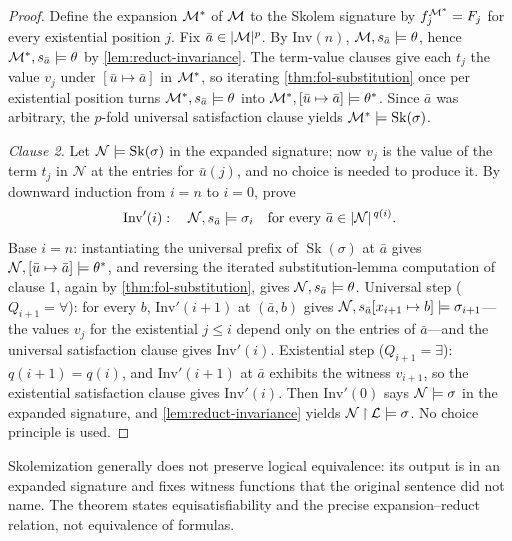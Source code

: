\begin{proof}
Define the expansion \(\mathcal M^{*}\) of \(\mathcal M\) to the Skolem signature
by \(f_j^{\mathcal M^{*}}=F_j\) for every existential position \(j\).  Fix
\(\bar a\in\lvert\mathcal M\rvert^{p}\).  By \(\mathrm{Inv}(n)\),
\(\mathcal M,s_{\bar a}\models\theta\), hence
\(\mathcal M^{*},s_{\bar a}\models\theta\) by \cref{lem:reduct-invariance}.
The term-value clauses give each \(t_j\) the value \(v_j\) under
\([\bar u\mapsto\bar a]\) in \(\mathcal M^{*}\), so iterating
\cref{thm:fol-substitution} once per existential position turns
\(\mathcal M^{*},s_{\bar a}\models\theta\) into
\(\mathcal M^{*},[\bar u\mapsto\bar a]\models\theta^{*}\).  Since \(\bar a\)
was arbitrary, the \(p\)-fold universal satisfaction clause yields
\(\mathcal M^{*}\models\operatorname{Sk}(\sigma)\).

\emph{Clause 2.}  Let \(\mathcal N\models\operatorname{Sk}(\sigma)\) in
the expanded signature; now \(v_j\) is the value of the term \(t_j\) in
\(\mathcal N\) at the entries for \(\bar u(j)\), and no choice is needed
to produce it.  By downward induction from \(i=n\) to \(i=0\), prove
\[
 \mathrm{Inv}'(i):\quad
 \mathcal N,s_{\bar a}\models\sigma_i
 \quad\text{for every }\bar a\in\lvert\mathcal N\rvert^{\,q(i)}.
\]
Base \(i=n\): instantiating the universal prefix of
\(\operatorname{Sk}(\sigma)\) at \(\bar a\) gives
\(\mathcal N,[\bar u\mapsto\bar a]\models\theta^{*}\), and reversing the
iterated substitution-lemma computation of clause 1, again by
\cref{thm:fol-substitution}, gives
\(\mathcal N,s_{\bar a}\models\theta\).  Universal step
(\(Q_{i+1}=\forall\)): for every \(b\), \(\mathrm{Inv}'(i+1)\) at
\((\bar a,b)\) gives
\(\mathcal N,s_{\bar a}[x_{i+1}\mapsto b]\models\sigma_{i+1}\)---the
values \(v_j\) for the existential \(j\le i\) depend only on the entries
of \(\bar a\)---and the universal satisfaction clause gives
\(\mathrm{Inv}'(i)\).  Existential step (\(Q_{i+1}=\exists\)):
\(q(i+1)=q(i)\), and \(\mathrm{Inv}'(i+1)\) at \(\bar a\) exhibits the
witness \(v_{i+1}\), so the existential satisfaction clause gives
\(\mathrm{Inv}'(i)\).  Then \(\mathrm{Inv}'(0)\) says
\(\mathcal N\models\sigma\) in the expanded signature, and
\cref{lem:reduct-invariance} yields
\(\mathcal N\mathbin{\upharpoonright}\mathcal{L}\models\sigma\).  No choice principle is used.
\end{proof}

Skolemization generally does not preserve logical equivalence: its output is
in an expanded signature and fixes witness functions that the original
sentence did not name.  The theorem states equisatisfiability and the precise
expansion--reduct relation, not equivalence of formulas.

